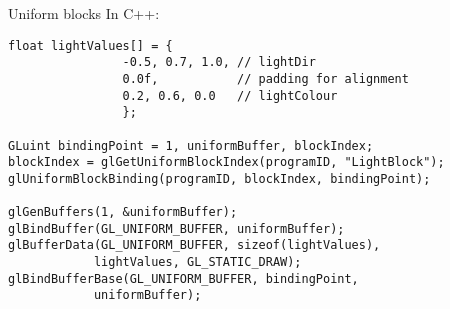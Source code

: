 \begin{frame}[fragile]{Uniform blocks}
In C++:
	\begin{lstlisting}
float lightValues[] = {
				-0.5, 0.7, 1.0,	// lightDir
				0.0f,			// padding for alignment
				0.2, 0.6, 0.0	// lightColour
				};

GLuint bindingPoint = 1, uniformBuffer, blockIndex;
blockIndex = glGetUniformBlockIndex(programID, "LightBlock");
glUniformBlockBinding(programID, blockIndex, bindingPoint);

glGenBuffers(1, &uniformBuffer);
glBindBuffer(GL_UNIFORM_BUFFER, uniformBuffer);
glBufferData(GL_UNIFORM_BUFFER, sizeof(lightValues),
			lightValues, GL_STATIC_DRAW);
glBindBufferBase(GL_UNIFORM_BUFFER, bindingPoint,
			uniformBuffer);
	\end{lstlisting}
\end{frame}


